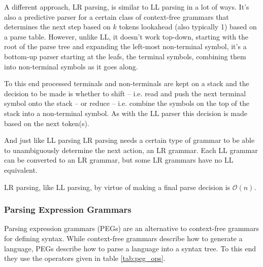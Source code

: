 			A different approach, LR parsing, is similar to LL parsing in a lot of ways. It's also a predictive parser for a certain class of context-free grammars that determines the next step based on $k$ tokens lookahead (also typically 1) based on a parse table. However, unlike LL, it doesn't work top-down, starting with the root of the parse tree and expanding the left-most non-terminal symbol, it's a bottom-up parser starting at the leafs, the terminal symbols, combining them into non-terminal symbols as it goes along.
			
			To this end processed terminals and non-terminals are kept on a stack and the decision to be made is whether to shift -- i.e. read and push the next terminal symbol onto the stack -- or reduce -- i.e. combine the symbols on the top of the stack into a non-terminal symbol. As with the LL parser this decision is made based on the next token(s).
			
			And just like LL parsing LR parsing needs a certain type of grammar to be able to unambiguously determine the next action, an LR grammar. Each LL grammar can be converted to an LR grammar, but some LR grammars have no LL equivalent.
			
			LR parsing, like LL parsing, by virtue of making a final parse decision is $\mathcal{O}(n)$.
			
			\subsubsection{Parsing Expression Grammars}
			
			Parsing expression grammars (PEGs) are an alternative to context-free grammars for defining syntax\cite{peg}. While context-free grammars describe how to generate a language, PEGs describe how to parse a language into a syntax tree. To this end they use the operators given in table \ref{tab:peg_ops}.
			
